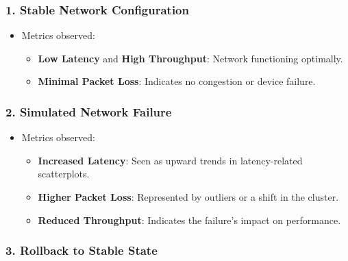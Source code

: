 \documentclass[11pt]{article}
\providecommand{\tightlist}{%
      \setlength{\itemsep}{0pt}\setlength{\parskip}{0pt}}
\begin{document}
\hypertarget{stable-network-configuration}{%
\subsubsection{\texorpdfstring{\textbf{1. Stable Network
Configuration}}{1. Stable Network Configuration}}\label{stable-network-configuration}}

\begin{itemize}
\tightlist
\item
  Metrics observed:

  \begin{itemize}
  \tightlist
  \item
    \textbf{Low Latency} and \textbf{High Throughput}: Network
    functioning optimally.
  \item
    \textbf{Minimal Packet Loss}: Indicates no congestion or device
    failure.
  \end{itemize}
\end{itemize}

\hypertarget{simulated-network-failure}{%
\subsubsection{\texorpdfstring{\textbf{2. Simulated Network
Failure}}{2. Simulated Network Failure}}\label{simulated-network-failure}}

\begin{itemize}
\tightlist
\item
  Metrics observed:

  \begin{itemize}
  \tightlist
  \item
    \textbf{Increased Latency}: Seen as upward trends in latency-related
    scatterplots.
  \item
    \textbf{Higher Packet Loss}: Represented by outliers or a shift in
    the cluster.
  \item
    \textbf{Reduced Throughput}: Indicates the failure's impact on
    performance.
  \end{itemize}
\end{itemize}

\hypertarget{rollback-to-stable-state}{%
\subsubsection{\texorpdfstring{\textbf{3. Rollback to Stable
State}}{3. Rollback to Stable State}}\label{rollback-to-stable-state}}
\end{document}
